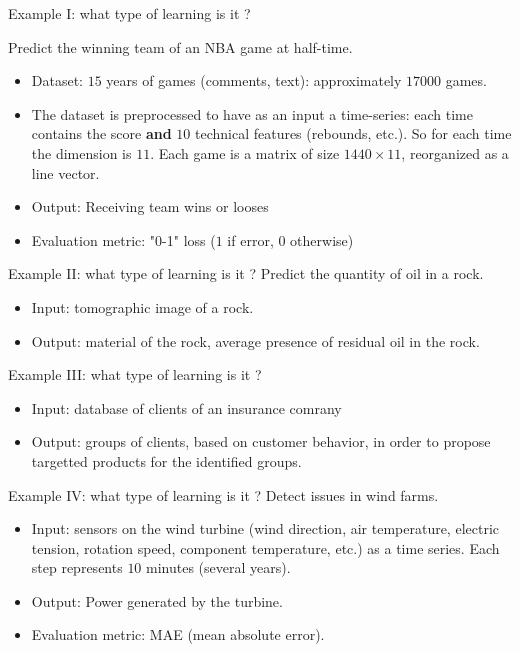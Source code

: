 \documentclass[usenames,dvipsnames]{beamer}
\begin{document}
\begin{frame}{Example I: what type of learning is it ?}

    Predict the winning team of an NBA game at half-time.
\begin{itemize}
    \item Dataset: $15$ years of games (comments, text): approximately $17000$
        games.
    \item The dataset is preprocessed to have as an input a time-series: each
        time contains the score \textbf{{and}}  $10$ technical features (rebounds, etc.).
        So for each time the dimension is $11$. Each game is a matrix of size $
        1440\times 11$, reorganized as a line vector.
    \item Output: Receiving team wins or looses
    \item Evaluation metric: "0-1" loss ($1$ if error, $0$ otherwise)
\end{itemize}
    
\end{frame}

\begin{frame}{Example II: what type of learning is it ?}
    Predict the quantity of oil in a rock.
    \begin{itemize}
        \item Input: tomographic image of a rock.
        \item Output: material of the rock, average presence of residual oil in
            the rock.
    \end{itemize}
\end{frame}

\begin{frame}{Example III: what type of learning is it ?}

    \begin{itemize}
    	\item Input: database of clients of an insurance comrany
	\item Output: groups of clients, based on customer behavior, in order to propose targetted products for the identified groups.
    \end{itemize}

\end{frame}

\begin{frame}{Example IV: what type of learning is it ?}
    Detect issues in wind farms.
    \begin{itemize}
        \item Input: sensors on the wind turbine (wind direction, air
            temperature, electric tension, rotation speed, component
            temperature, etc.) as a time series. Each step represents $10$
            minutes (several years).
        \item Output: Power generated by the turbine.
        \item Evaluation metric: MAE (mean absolute error).
    \end{itemize}
\end{frame}
\end{document}

